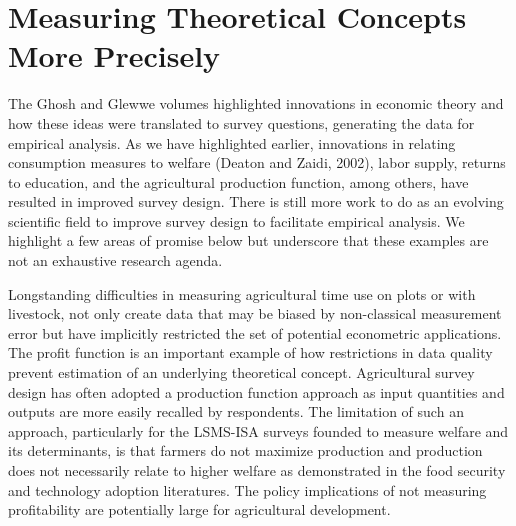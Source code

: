 \documentclass[
]{book}
\begin{document}
\hypertarget{measuring-theoretical-concepts-more-precisely}{%
\section{Measuring Theoretical Concepts More Precisely}\label{measuring-theoretical-concepts-more-precisely}}

The Ghosh and Glewwe volumes highlighted innovations in economic theory and how these ideas were translated to survey questions, generating the data for empirical analysis. As we have highlighted earlier, innovations in relating consumption measures to welfare (Deaton and Zaidi, 2002), labor supply, returns to education, and the agricultural production function, among others, have resulted in improved survey design. There is still more work to do as an evolving scientific field to improve survey design to facilitate empirical analysis. We highlight a few areas of promise below but underscore that these examples are not an exhaustive research agenda.

Longstanding difficulties in measuring agricultural time use on plots or with livestock, not only create data that may be biased by non-classical measurement error but have implicitly restricted the set of potential econometric applications. The profit function is an important example of how restrictions in data quality prevent estimation of an underlying theoretical concept. Agricultural survey design has often adopted a production function approach as input quantities and outputs are more easily recalled by respondents. The limitation of such an approach, particularly for the LSMS-ISA surveys founded to measure welfare and its determinants, is that farmers do not maximize production and production does not necessarily relate to higher welfare as demonstrated in the food security and technology adoption literatures. The policy implications of not measuring profitability are potentially large for agricultural development.
\end{document}
